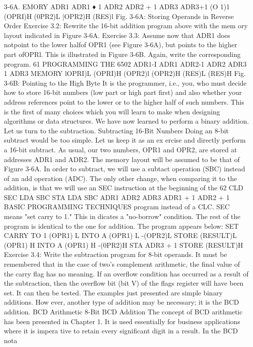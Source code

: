 \documentclass{book}
\begin{document}
3-6A.
EMORY
ADR1
ADR1 ♦ 1
ADR2
ADR2 + 1
ADR3
ADR3+1
(O 1)1
(OPRI)H
(0PR2)L
|OPR2)H
(RES)l
Fig. 3-6A: Storing Operands in Reverse Order
Exercise 3.2: Rewrite the 16-bit addition program above with the mem
ory layout indicated in Figure 3-6A.
Exercise 3.3: Assume now that ADR1 does notpoint to the lower halfof
OPR1 (see Figure 3-6A), but points to the higher part ofOPRl. This is
illustrated in Figure 3-6B. Again, write the corresponding program.
61
PROGRAMMING THE 6502
ADR1-I
ADR1
ADR2-1
ADR2
ADR3 1
ADR3
MEMORY
lOPRI)L
(OPRI)H
(OPR2)l
(OPR2)H
(RES)L
(RES)H
Fig. 3-6B: Pointing to the High Byte
It is the programmer, i.e., you, who must decide how to store 16-bit
numbers (low part or high part first) and also whether your address
references point to the lower or to the higher half of such numbers.
This is the first of many choices which you will learn to make when
designing algorithms or data structures.
We have now learned to perform a binary addition. Let us turn
to the subtraction.
Subtracting 16-Bit Numbers
Doing an 8-bit subtract would be too simple. Let us keep it as an ex
ercise and directly perform a 16-bit subtract. As usual, our two
numbers, OPR1 and OPR2, are stored at addresses ADR1 and ADR2.
The memory layout will be assumed to be that of Figure 3-6A. In order
to subtract, we will use a subtact operation (SBC) instead of an add
operation (ADC). The only other change, when comparing it to the
addition, is that we will use an SEC instruction at the beginning of the
62
CLD
SEC
LDA
SBC
STA
LDA
SBC
ADR1
ADR2
ADR3
ADR1 + 1
ADR2 + 1
BASIC PROGRAMMING TECHNIQUES
program instead of a CLC. SEC means "set carry to 1." This in
dicates a "no-borrow" condition. The rest of the program is identical
to the one for addition. The program appears below:
SET CARRY TO 1
(OPR1) L INTO A
(OPR1) L -(OPR2)L
STORE (RESULT)L
(OPR1) H INTO A
(OPR1) H -(0PR2)H
STA ADR3 + 1 STORE (RESULT)H
Exercise 3.4: Write the subtraction program for 8-bit operands.
It must be remembered that in the case of two's complement
arithmetic, the final value of the carry flag has no meaning. If an
overflow condition has occurred as a result of the subtraction,
then the overflow bit (bit V) of the flags register will have been
set. It can then be tested.
The examples just presented are simple binary additions. How
ever, another type of addition may be necessary; it is the BCD
addition.
BCD Arithmetic
8-Bit BCD Addition
The concept of BCD arithmetic has been presented in Chapter 1.
It is used essentially for business applications where it is impera
tive to retain every significant digit in a result. In the BCD nota
\end{document}
